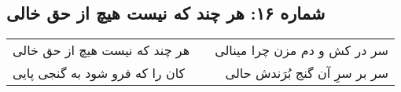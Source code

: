 \begin{center}
\section*{شماره ۱۶: هر چند که نیست هیچ از حق خالی}
\label{sec:016}
\begin{longtable}{l p{0.5cm} r}
هر چند که نیست هیچ از حق خالی
&&
سر در کش و دم مزن چرا مینالی
\\
کان را که فرو شود به گنجی پایی
&&
سر بر سرِ آن گنج بُرَندش حالی
\\
\end{longtable}
\end{center}
